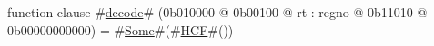 function clause #\hyperref[zdecode]{decode}# (0b010000 @ 0b00100 @ rt : regno @ 0b11010 @ 0b00000000000) =
  #\hyperref[zSome]{Some}#(#\hyperref[zHCF]{HCF}#())
